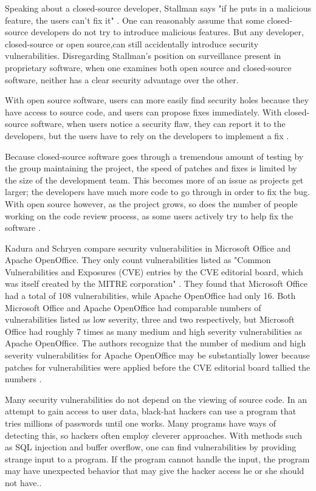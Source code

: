 ﻿Speaking about a closed-source developer, Stallman says "if he puts in a
malicious feature, the users can't fix it" \citeyear[para. 36]{rms2011}.
One can reasonably assume that some closed-source developers do not try
to introduce malicious features. But any developer, closed-source or
open source,can still accidentally introduce security
vulnerabilities. Disregarding Stallman's position on surveillance present in
proprietary software, when one examines both open source and closed-source
software, neither has a clear security advantage over the other.

With open source software, users can more easily find security holes because
they have access to source code, and users can propose fixes immediately.
With closed-source software, when users notice a security flaw, they can report
it to the developers, but the users have to rely on the developers to implement a
fix \cite[para. 17]{kadura}.

Because closed-source software goes through a tremendous amount of testing
by the group maintaining the project, the speed of patches and fixes is limited
by the size of the development team. This becomes more of an issue as projects
get larger; the developers have much more code to go through in order to fix the
bug. With open source however, as the project grows, so does the number of
people working on the code review process, as some users actively try to help
fix the software \cite[p. ~245]{boulanger}.

Kadura and Schryen compare security vulnerabilities in Microsoft
Office and Apache OpenOffice. They only count vulnerabilities listed
as "Common Vulnerabilities and Exposures (CVE) entries by the CVE editorial
board, which was itself created by the MITRE corporation"
\citeyear{kadura}. They found that Microsoft Office had a total of 108
vulnerabilities, while Apache OpenOffice had only 16. Both Microsoft Office and
Apache OpenOffice had comparable numbers of vulnerabilities listed as low severity,
three and two respectively, but Microsoft Office had roughly 7 times as many
medium and high severity vulnerabilities as Apache OpenOffice. The authors recognize
that the number of medium and high severity vulnerabilities for Apache OpenOffice may
be substantially lower because patches for vulnerabilities were applied before
the CVE editorial board tallied the numbers \cite{kadura}.

Many security vulnerabilities do not depend on the viewing of source code.
In an attempt to gain access to user data, black-hat hackers can use a program
that tries millions of passwords until one works. Many programs have ways of
detecting this, so hackers often employ cleverer approaches. With methods
such as SQL injection and buffer overflow, one can find vulnerabilities by
providing strange input to a program. If the program cannot handle the input,
the program may have unexpected behavior that may give the hacker access he or she
should not have.\cite[p. ~8-9]{clarke}.

